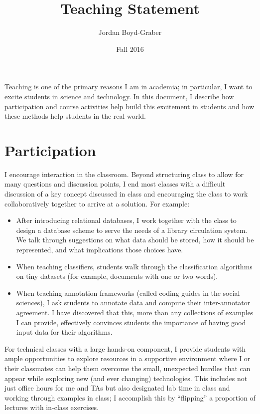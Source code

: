 \documentclass[11pt]{amsart}
\begin{document}
 \title{Teaching Statement}

 \author{Jordan Boyd-Graber}
\address{University of Colorado}

\date{Fall 2016}


\keywords{}

\maketitle

Teaching is one of the primary reasons I am in academia; in particular, I want
to excite students in science and technology.  In this document, I describe how
participation and course activities help build this excitement in students and
how these methods help students in the real world.

\section{Participation}

I encourage interaction in the classroom.  Beyond structuring class to allow for
many questions and discussion points, I end most classes with a difficult
discussion of a key concept discussed in class and encouraging the class to work
collaboratively together to arrive at a solution.  For example:
\begin{itemize}
  \item After introducing relational databases, I work together with the class to
design a database scheme to serve the needs of a library circulation
system.  We talk through suggestions on what data should be stored,
how it should be represented, and what implications those choices
have.
  \item When teaching classifiers, students walk through the classification
    algorithms on tiny datasets (for example, documents with one or two words).
  \item When teaching annotation frameworks (called coding guides in the
    social sciences), I ask students to annotate data and
    compute their inter-annotator agreement.  I have discovered that this, more
    than any collections of examples I can provide, effectively convinces
    students the importance of having good input data for their algorithms.
\end{itemize}

For technical classes with a large hands-on component, I provide students with
ample opportunities to explore resources in a supportive environment where I or
their classmates can help them overcome the small, unexpected hurdles that can
appear while exploring new (and ever changing) technologies.  This includes not
just office hours for me and TAs but also designated lab time in class and
working through examples in class; I accomplish this by ``flipping'' a
proportion of lectures with in-class exercises.
\end{document}

